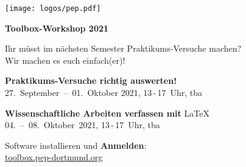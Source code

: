 \documentclass[paper=landscape]{scrartcl}
\begin{document}
  \begin{minipage}{0.25\textwidth}%
    \texttt{[image: logos/pep.pdf]}%
  \end{minipage}%
  \begin{minipage}{0.75\textwidth}%
    \centering\fontsize{50}{60}\bfseries\selectfont Toolbox-Workshop 2021%
  \end{minipage}%

  \vspace{0.5cm}

  \begin{center}
    \Huge Ihr müsst im nächsten Semester Praktikums-Versuche machen? \\[0.5\baselineskip]
    Wir machen es euch einfach(er)!
  \end{center}

  \vspace{0.5cm}

  \begin{center}
    \huge \textbf{Praktikums-Versuche richtig auswerten!} \\[0.5\baselineskip]
    27.~September~–~01.~Oktober 2021, 13\,-\,17~Uhr, tba
  \end{center}
  \vspace{0.5cm}
  \begin{center}
    \huge \textbf{Wissenschaftliche Arbeiten verfassen mit} \textrm{\LaTeX}\\[0.5\baselineskip]
    04.~–~08.~Oktober~2021, 13\,-\,17~Uhr, tba
  \end{center}
  \vspace{0.5cm}
  \begin{center}
    \large Software installieren und \textbf{Anmelden}: \\
    \Huge \href{https://toolbox.pep-dortmund.org}{toolbox.pep-dortmund.org}
  \end{center}

\end{document}
